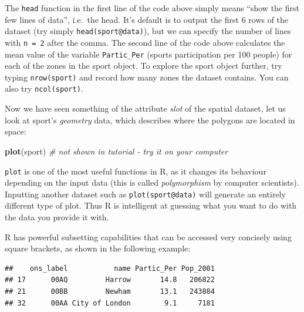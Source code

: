 \documentclass[]{article}
\newenvironment{Shaded}{}{}
\newcommand{\KeywordTok}[1]{\textcolor[rgb]{0.00,0.44,0.13}{\textbf{{#1}}}}
\newcommand{\DecValTok}[1]{\textcolor[rgb]{0.25,0.63,0.44}{{#1}}}
\newcommand{\StringTok}[1]{\textcolor[rgb]{0.25,0.44,0.63}{{#1}}}
\newcommand{\CommentTok}[1]{\textcolor[rgb]{0.38,0.63,0.69}{\textit{{#1}}}}
\newcommand{\NormalTok}[1]{{#1}}
\begin{document}
The \texttt{head} function in the first line of the code above simply
means ``show the first few lines of data'', i.e.~the head. It's default
is to output the first 6 rows of the dataset (try simply
\texttt{head(sport@data)}), but we can specify the number of lines with
\texttt{n = 2} after the comma. The second line of the code above
calculates the mean value of the variable \texttt{Partic\_Per} (sports
participation per 100 people) for each of the zones in the sport object.
To explore the sport object further, try typing \texttt{nrow(sport)} and
record how many zones the dataset contains. You can also try
\texttt{ncol(sport)}.

Now we have seen something of the attribute \emph{slot} of the spatial
dataset, let us look at sport's \emph{geometry} data, which describes
where the polygons are located in space:

\begin{Shaded}
\begin{Highlighting}[]
\KeywordTok{plot}\NormalTok{(sport)  }\CommentTok{# not shown in tutorial - try it on your computer}
\end{Highlighting}
\end{Shaded}

\texttt{plot} is one of the most useful functions in R, as it changes
its behaviour depending on the input data (this is called
\emph{polymorphism} by computer scientists). Inputting another dataset
such as \texttt{plot(sport@data)} will generate an entirely different
type of plot. Thus R is intelligent at guessing what you want to do with
the data you provide it with.

R has powerful subsetting capabilities that can be accessed very
concisely using square brackets, as shown in the following example:

\begin{Shaded}
\end{Shaded}

\begin{verbatim}
##    ons_label           name Partic_Per Pop_2001
## 17      00AQ         Harrow       14.8   206822
## 21      00BB         Newham       13.1   243884
## 32      00AA City of London        9.1     7181
\end{verbatim}
\end{document}
